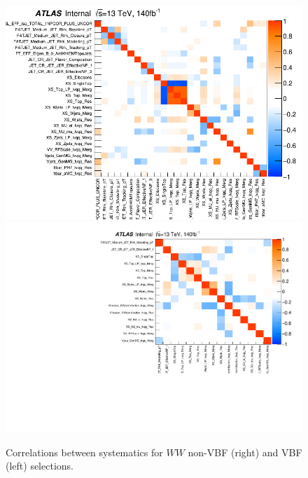 \begin{figure}[h!]
  \centering
  \includegraphics[width=0.48\hsize]{figures/Results/HVTWW/HVTWW_combined_1nov8_maybeFloatRelevantUncorrXSSingleBinPrunSyst/Plots/CorrMatrix/corr_doAsimov0_doCondtional1_mu0_HighCorr.png}
   \includegraphics[width=0.48\hsize]{figures/Results/HVTWWVBF/HVTWWVBF_combined_1nov8_maybeFloatRelevantUncorrXSSingleBinPrunSyst/Plots/CorrMatrix/corr_doAsimov0_doCondtional1_mu0_HighCorr.pdf}
 \caption{Correlations between systematics for $WW$ non-VBF (right) and VBF (left) selections.} 
  \label{fig:hvtww_corr}
\end{figure} 
\FloatBarrier


